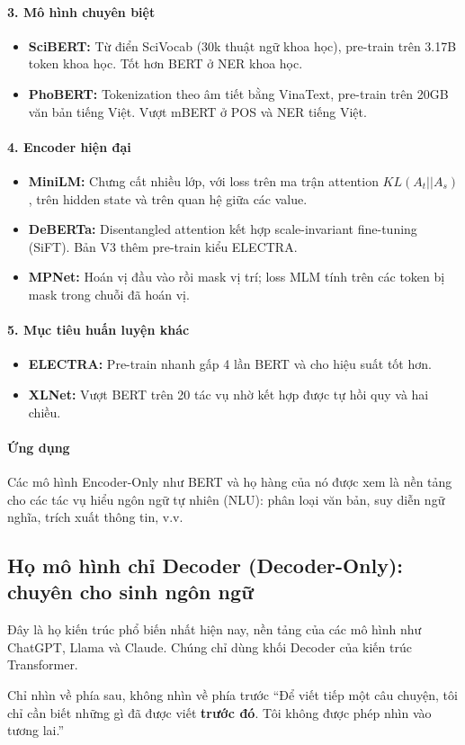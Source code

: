 \paragraph{3. Mô hình chuyên biệt}
\begin{itemize}
	\item \textbf{SciBERT:} Từ điển SciVocab (30k thuật ngữ khoa học), pre-train trên 3.17B token khoa học. Tốt hơn BERT ở NER khoa học.
	\item \textbf{PhoBERT:} Tokenization theo âm tiết bằng VinaText, pre-train trên 20GB văn bản tiếng Việt. Vượt mBERT ở POS và NER tiếng Việt.
\end{itemize}

\paragraph{4. Encoder hiện đại}
\begin{itemize}
	\item \textbf{MiniLM:} Chưng cất nhiều lớp, với loss trên ma trận attention $KL(A_t || A_s)$, trên hidden state và trên quan hệ giữa các value.
	\item \textbf{DeBERTa:} Disentangled attention kết hợp scale-invariant fine-tuning (SiFT). Bản V3 thêm pre-train kiểu ELECTRA.
	\item \textbf{MPNet:} Hoán vị đầu vào rồi mask vị trí; loss MLM tính trên các token bị mask trong chuỗi đã hoán vị.
\end{itemize}

\paragraph{5. Mục tiêu huấn luyện khác}
\begin{itemize}
	\item \textbf{ELECTRA:} Pre-train nhanh gấp 4 lần BERT và cho hiệu suất tốt hơn.
	\item \textbf{XLNet:} Vượt BERT trên 20 tác vụ nhờ kết hợp được tự hồi quy và hai chiều.
\end{itemize}

\paragraph{Ứng dụng}
Các mô hình Encoder-Only như BERT và họ hàng của nó được xem là nền tảng cho các tác vụ hiểu ngôn ngữ tự nhiên (NLU): phân loại văn bản, suy diễn ngữ nghĩa, trích xuất thông tin, v.v.

\subsection{Họ mô hình chỉ Decoder (Decoder-Only): chuyên cho sinh ngôn ngữ}
\label{ssec:decoder_only}
Đây là họ kiến trúc phổ biến nhất hiện nay, nền tảng của các mô hình như ChatGPT, Llama và Claude. Chúng chỉ dùng khối Decoder của kiến trúc Transformer.
\begin{keyidea}{Chỉ nhìn về phía sau, không nhìn về phía trước}
	“Để viết tiếp một câu chuyện, tôi chỉ cần biết những gì đã được viết \textbf{trước đó}. Tôi không được phép nhìn vào tương lai.”
\end{keyidea}
